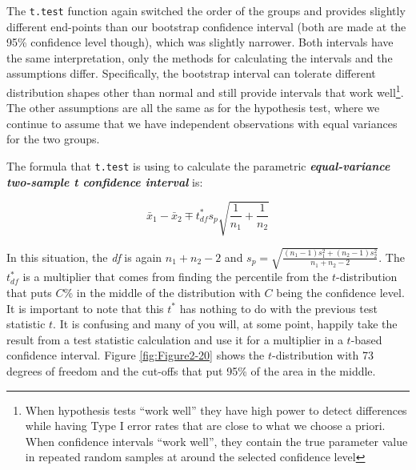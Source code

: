 \documentclass[]{book}
\let\rmarkdownfootnote\footnote%
\def\footnote{\protect\rmarkdownfootnote}
\theoremstyle{definition}
\theoremstyle{definition}
\theoremstyle{remark}
\begin{document}
The \texttt{t.test} function again switched the order of the groups and
provides slightly different end-points than our bootstrap confidence
interval (both are made at the 95\% confidence level though), which was
slightly narrower. Both intervals have the same interpretation, only the
methods for calculating the intervals and the assumptions differ.
Specifically, the bootstrap interval can tolerate different distribution
shapes other than normal and still provide intervals that work
well\footnote{When hypothesis tests ``work well'' they have high power
  to detect differences while having Type I error rates that are close
  to what we choose a priori. When confidence intervals ``work well'',
  they contain the true parameter value in repeated random samples at
  around the selected confidence level}. The other assumptions are all
the same as for the hypothesis test, where we continue to assume that we
have independent observations with equal variances for the two groups.

The formula that \texttt{t.test} is using to calculate the parametric
\textbf{\emph{equal-variance two-sample t confidence interval}} is:

\[\bar{x}_1 - \bar{x}_2 \mp t^*_{df}s_p\sqrt{\frac{1}{n_1}+\frac{1}{n_2}}\]

In this situation, the \emph{df} is again \(n_1+n_2-2\) and
\(s_p = \sqrt{\frac{(n_1-1)s_1^2 + (n_2-1)s_2^2}{n_1+n_2-2}}\). The
\(t^*_{df}\) is a multiplier that comes from finding the percentile from
the \(t\)-distribution that puts \(C\)\% in the middle of the
distribution with \(C\) being the confidence level. It is important to
note that this \(t^*\) has nothing to do with the previous test
statistic \(t\). It is confusing and many of you will, at some point,
happily take the result from a test statistic calculation and use it for
a multiplier in a \(t\)-based confidence interval. Figure
\ref{fig:Figure2-20} shows the \(t\)-distribution with 73 degrees of
freedom and the cut-offs that put 95\% of the area in the middle.
\end{document}

